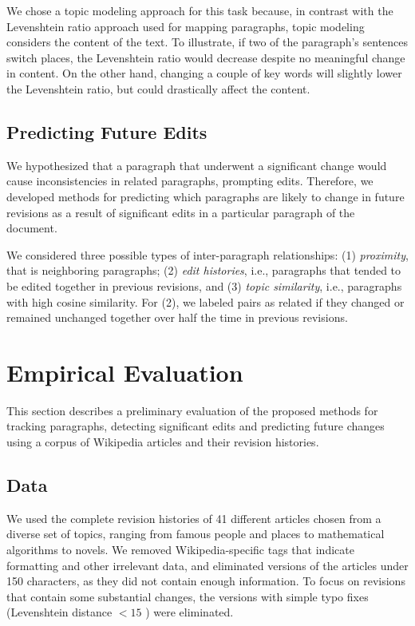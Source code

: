 We chose a topic modeling approach for this task because, in contrast
with the Levenshtein ratio approach used for mapping paragraphs, topic
modeling considers the content of the text. To illustrate, if two of the
paragraph's sentences switch places, the Levenshtein ratio would
decrease despite no meaningful change in content. On the other hand,
changing a couple of key words will slightly lower the Levenshtein
ratio, but could drastically affect the content.

\subsection{Predicting Future Edits}\label{predicting-future-edits}

We hypothesized that a paragraph that underwent a significant change
would cause inconsistencies in related paragraphs, prompting edits.
Therefore, we developed methods for predicting which paragraphs are
likely to change in future revisions as a result of significant edits in
a particular paragraph of the document.

We considered three possible types of inter-paragraph relationships: (1)
\emph{proximity}, that is neighboring paragraphs; (2) \emph{edit
histories}, i.e., paragraphs that tended to be edited together in
previous revisions, and (3) \emph{topic similarity}, i.e., paragraphs
with high cosine similarity. For (2), we labeled pairs as related if
they changed or remained unchanged together over half the time in
previous revisions.

\section{Empirical Evaluation}\label{empirical-evaluation}

This section describes a preliminary evaluation of the proposed methods
for tracking paragraphs, detecting significant edits and predicting
future changes using a corpus of Wikipedia articles and their revision
histories.

\subsection{Data}\label{data}

We used the complete revision histories of 41 different articles chosen
from a diverse set of topics, ranging from famous people and places to
mathematical algorithms to novels. We removed Wikipedia-specific tags
that indicate formatting and other irrelevant data, and eliminated
versions of the articles under 150 characters, as they did not contain
enough information. To focus on revisions that contain some substantial
changes, the versions with simple typo fixes (Levenshtein distance
\(< 15\) ) were eliminated.


